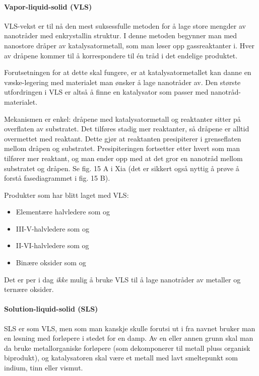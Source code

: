 \paragraph{Vapor-liquid-solid (VLS)}
VLS-vekst er til nå den mest suksessfulle metoden for å lage store mengder av nanotråder med enkrystallin struktur. I denne metoden begynner man med nanostore dråper av katalysatormetall, som man løser opp gassreaktanter i. Hver av dråpene kommer til å korrespondere til én tråd i det endelige produktet. 

Forutsetningen for at dette skal fungere, er at katalysatormetallet kan danne en væske-legering med materialet man ønsker å lage nanotråder av. Den største utfordringen i VLS er altså å finne en katalysator som passer med nanotråd-materialet. %

Mekanismen er enkel: dråpene med katalysatormetall og reaktanter sitter på overflaten av substratet. Det tilføres stadig mer reaktanter, så dråpene er alltid overmettet med reaktant. Dette gjør at reaktanten presipiterer i grenseflaten mellom dråpen og substratet. Presipiteringen fortsetter etter hvert som man tilfører mer reaktant, og man ender opp med at det gror en nanotråd mellom substratet og dråpen. Se fig. 15 A i Xia (det er sikkert også nyttig å prøve å forstå fasediagrammet i fig. 15 B).

Produkter som har blitt laget med VLS:
\begin{itemize}
	\item Elementære halvledere som  og 
	\item III-V-halvledere som  og 
	\item II-VI-halvledere som  og 
	\item Binære oksider som  og 
\end{itemize}
Det er per i dag \emph{ikke} mulig å bruke VLS til å lage nanotråder av metaller og ternære oksider.

\paragraph{Solution-liquid-solid (SLS)}
SLS er som VLS, men som man kanskje skulle forutsi ut i fra navnet bruker man en løsning med forløpere i stedet for en damp. Av en eller annen grunn skal man da bruke metallorganiske forløpere (som dekomponerer til metall pluss organisk biprodukt), og katalysatoren skal være et metall med lavt smeltepunkt som indium, tinn eller vismut.

